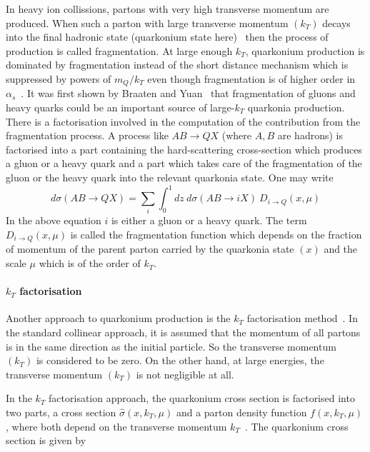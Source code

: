In heavy ion collissions, partons with very high transverse momentum are produced.
When such a parton  with large transverse momentum $(k_T)$ decays into the final
hadronic state (quarkonium state here)~\cite{frag} then the process of production is called
fragmentation. At large enough $k_T$, quarkonium production is dominated by
fragmentation instead of the short distance mechanism which 
is suppressed by powers of $m_Q/k_T$ even though fragmentation is of higher
order in $\alpha_s$~\cite{frag}. 
 It was first shown by Braaten and Yuan~\cite{frag,frag1} that fragmentation of gluons and heavy quarks
 could be an important source of large-$k_T$ quarkonia production.
 There is a factorisation involved in the computation of the contribution 
 from the fragmentation process. A process like $A  B \rightarrow Q  X$ (where $A,B$ are  hadrons)
 is factorised  into a part containing the hard-scattering cross-section which produces
 a gluon or a heavy quark 
and a part which takes care of the fragmentation of the gluon or the heavy quark into the
relevant quarkonia state. One may write 
\begin{equation}
d\sigma (A  B \rightarrow Q X) = \sum_i \int_0^1 dz \ d\sigma  (A  B \rightarrow i  X) \ D_{i \rightarrow Q} (x,\mu)
\end{equation}
In the above equation $i$ is either a gluon or a heavy quark. The term $D_{i \rightarrow Q} (x,\mu)$ 
is called the fragmentation function which depends on the fraction of momentum of the parent parton 
carried by the quarkonia state $(x)$ and the scale $\mu$ which is of the order of $k_T$. 

\paragraph{$k_T$ factorisation}

Another approach to quarkonium production is the $k_T$ factorisation method~\cite{kt1,kt2}.
In the  standard collinear approach, it is assumed that the momentum of all partons is
in the same direction as the initial particle. So the  transverse momentum $(k_T)$ is
considered to be zero. On the other hand, at large energies, the transverse
momentum $(k_T)$ is not negligible at all. 
 
In the $k_T$ factorisation approach, the quarkonium cross section is factorised
into two parts,  a cross section ${\hat \sigma} (x, k_T, \mu)$ and a parton
density function $f(x, k_T, \mu)$, where both depend on the transverse
momentum $k_T$~\cite{kt3}.  The quarkonium cross section is given by 
 
